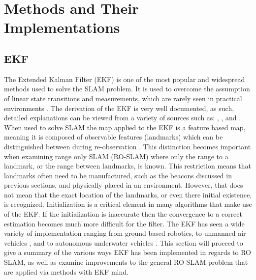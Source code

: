 \documentclass[conference]{IEEEtran}
\begin{document}
	
	

	\section{Methods and Their Implementations}
	
	\subsection{EKF}
	
	
	
	The Extended Kalman Filter (EKF) is one of the most popular and widespread methods used to solve the SLAM problem. It is used to overcome the assumption of linear state transitions and measurements, which are rarely seen in practical environments \cite{Thrun2002}. The derivation of the EKF is very well documented, as such, detailed explanations can be viewed from a variety of sources such as: \cite{Thrun2002}, \cite{Ribeiro2004}, and \cite{Haykin2001}. When used to solve SLAM the map applied to the EKF is a feature based map, meaning it is composed of observable features (landmarks) which can be distinguished between during re-observation \cite{Thrun2002}. This distinction becomes important when examining range only SLAM (RO-SLAM) where only the range to a landmark, or the range between landmarks, is known. This restriction means that landmarks often need to be manufactured, such as the beacons discussed in previous sections, and physically placed in an environment. However, that does not mean that the exact location of the landmarks, or even there initial existence, is recognized. Initialization is a critical element in many algorithms that make use of the EKF. If the initialization is inaccurate then the convergence to a correct estimation becomes much more difficult for the filter. The EKF has seen a wide variety of implementation ranging from ground based robotics\cite{Djugash2008}, to unmanned air vehicles \cite{Fabresse2016}, and to autonomous underwater vehicles \cite{Olson2006}. This section will proceed to give a summary of the various ways EKF has been implemented in regards to RO SLAM, as well as examine improvements to the general RO SLAM problem that are applied via methods with EKF mind.
	
	
	
\end{document}
